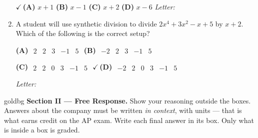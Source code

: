 \documentclass[10pt]{article}
\begin{document}
\begin{enumerate}[leftmargin=1.9em, itemsep=14pt]
      \smallskip
      {\color{keyred}\textbf{$\checkmark$\,(A)}} $x + 1$ \hspace{2.6em} \textbf{(B)} $x - 1$ \hspace{2.6em} \textbf{(C)} $x + 2$ \hspace{2.6em} \textbf{(D)} $x - 6$ \hfill\textit{Letter:}~\gradedblank[id=ap4, type=choice, points=1, answer=A]{0.42in}{13pt}

\item A student will use synthetic division to divide $2x^4 + 3x^2 - x + 5$ by $x + 2$. Which
      of the following is the correct setup?

      \smallskip
      {\setlength{\arraycolsep}{3pt}%
      \textbf{(A)} $\begin{array}{r|rrrr} 2 & 2 & 3 & -1 & 5 \end{array}$ \hspace{1.4em}
      \textbf{(B)} $\begin{array}{r|rrrr} -2 & 2 & 3 & -1 & 5 \end{array}$

      \smallskip
      \textbf{(C)} $\begin{array}{r|rrrrr} 2 & 2 & 0 & 3 & -1 & 5 \end{array}$ \hspace{1.4em}
      {\color{keyred}\textbf{$\checkmark$\,(D)}} $\begin{array}{r|rrrrr} -2 & 2 & 0 & 3 & -1 & 5 \end{array}$} \hfill\textit{Letter:}~\gradedblank[id=ap5, type=choice, points=1, answer=D]{0.42in}{13pt}

\end{enumerate}

\newpage

\begin{headlinebox}{goldbg}
\small
\textbf{Section II --- Free Response.} Show your reasoning outside the boxes. Answers about the
company must be written \emph{in context}, with units --- that is what earns credit on the AP
exam. Write each final answer in its box. Only what is inside a box is graded.
\end{headlinebox}

\vspace{0.04in}
\end{document}

